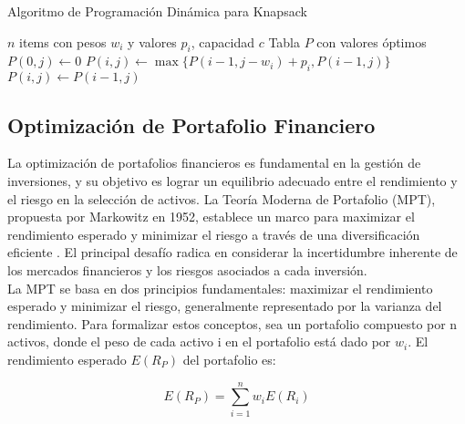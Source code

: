 \documentclass[9pt,a4paper,twoside]{rho-class/rho}
\begin{document}
            \begin{algorithm}
                \caption{Algoritmo de Programación Dinámica para Knapsack}
                \begin{algorithmic}[1]
                \Require $n$ items con pesos $w_i$ y valores $p_i$, capacidad $c$
                \Ensure Tabla $P$ con valores óptimos
                    \State $P(0,j) \gets 0$
                \EndFor
                            \State $P(i,j) \gets \max\{P(i-1,j-w_i) + p_i, P(i-1,j)\}$
                        \Else
                            \State $P(i,j) \gets P(i-1,j)$
                        \EndIf
                    \EndFor
                \EndFor
                \end{algorithmic}
            \end{algorithm}


        
        \subsection{Optimización de Portafolio Financiero}
            La optimización de portafolios financieros es fundamental en la gestión de inversiones, y su objetivo es lograr un equilibrio adecuado entre el rendimiento y el riesgo en la selección de activos. La Teoría Moderna de Portafolio (MPT), propuesta por Markowitz en 1952, establece un marco para maximizar el rendimiento esperado y minimizar el riesgo a través de una diversificación eficiente \cite{Deb2001}. El principal desafío radica en considerar la incertidumbre inherente de los mercados financieros y los riesgos asociados a cada inversión.
            \\
            La MPT se basa en dos principios fundamentales: maximizar el rendimiento esperado y minimizar el riesgo, generalmente representado por la varianza del rendimiento. Para formalizar estos conceptos, sea un portafolio compuesto por n activos, donde el peso de cada activo i en el portafolio está dado por ${w}_{i}$. El rendimiento esperado $E\left({R}_{P}\right)$ del portafolio es:

            \begin{equation}
                \label{ec:ecuacion1}
            E\left({R}_{P}\right)=\sum _{i=1}^{n}{w}_{i}E\left({R}_{i}\right)
            \end{equation}
\end{document}
